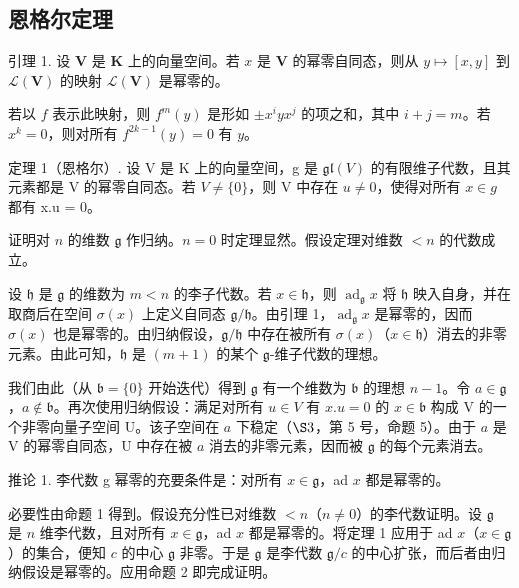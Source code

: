 \subsection{恩格尔定理}

引理 1. 设 \(\mathbf{V}\) 是 \(\mathbf{K}\) 上的向量空间。若 \(x\) 是 \(\mathbf{V}\) 的幂零自同态，则从 \(y \mapsto [x, y]\) 到 \(\mathcal{L}(\mathbf{V})\) 的映射 \(\mathcal{L}(\mathbf{V})\) 是幂零的。

若以 \(f\) 表示此映射，则 \(f^m(y)\) 是形如 \(\pm x^i y x^j\) 的项之和，其中 \(i + j = m\)。若 \(x^k = 0\)，则对所有 \(f^{2k - 1}(y) = 0\) 有 \(y\)。

定理 1（恩格尔）. 设 V 是 K 上的向量空间，g 是 \(\mathfrak{gl}(V)\) 的有限维子代数，且其元素都是 V 的幂零自同态。若 \(V \neq \{0\}\)，则 V 中存在 \(u \neq 0\)，使得对所有 \(x \in g\) 都有 x.u = 0。

证明对 \(n\) 的维数 \(\mathfrak{g}\) 作归纳。\(n = 0\) 时定理显然。假设定理对维数 \(< n\) 的代数成立。

设 \(\mathfrak{h}\) 是 \(\mathfrak{g}\) 的维数为 \(m < n\) 的李子代数。若 \(x \in \mathfrak{h}\)，则 \(\operatorname{ad}_{\mathfrak{g}} x\) 将 \(\mathfrak{h}\) 映入自身，并在取商后在空间 \(\sigma(x)\) 上定义自同态 \(\mathfrak{g} / \mathfrak{h}\)。由引理 1，\(\operatorname{ad}_{\mathfrak{g}} x\) 是幂零的，因而 \(\sigma(x)\) 也是幂零的。由归纳假设，\(\mathfrak{g} / \mathfrak{h}\) 中存在被所有 \(\sigma(x)\)（\(x \in \mathfrak{h}\)）消去的非零元素。由此可知，\(\mathfrak{h}\) 是 \((m + 1)\) 的某个 \(\mathfrak{g}\)-维子代数的理想。

我们由此（从 \(\mathfrak{b} = \{0\}\) 开始迭代）得到 \(\mathfrak{g}\) 有一个维数为 \(\mathfrak{b}\) 的理想 \(n - 1\)。令 \(a \in \mathfrak{g}\)，\(a \notin \mathfrak{b}\)。再次使用归纳假设：满足对所有 \(u \in V\) 有 \(x.u = 0\) 的 \(x \in \mathfrak{b}\) 构成 V 的一个非零向量子空间 U。该子空间在 \(a\) 下稳定（\(\S 3\)，第 5 号，命题 5）。由于 \(a\) 是 V 的幂零自同态，U 中存在被 \(a\) 消去的非零元素，因而被 \(\mathfrak{g}\) 的每个元素消去。

推论 1. 李代数 g 幂零的充要条件是：对所有 \(x \in \mathfrak{g}\)，ad \(x\) 都是幂零的。

必要性由命题 1 得到。假设充分性已对维数 \(< n\)（\(n \neq 0\)）的李代数证明。设 \(\mathfrak{g}\) 是 \(n\) 维李代数，且对所有 \(x \in \mathfrak{g}\)，ad \(x\) 都是幂零的。将定理 1 应用于 ad \(x\)（\(x \in \mathfrak{g}\)）的集合，便知 \(c\) 的中心 \(\mathfrak{g}\) 非零。于是 \(\mathfrak{g}\) 是李代数 \(\mathfrak{g}/c\) 的中心扩张，而后者由归纳假设是幂零的。应用命题 2 即完成证明。

